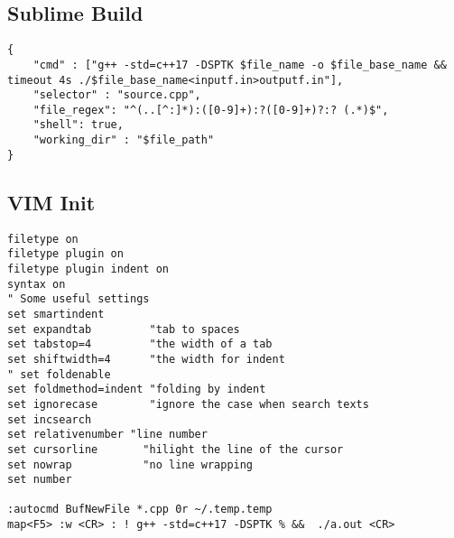 \subsection*{Sublime Build}
\begin{lstlisting}
{
    "cmd" : ["g++ -std=c++17 -DSPTK $file_name -o $file_base_name && timeout 4s ./$file_base_name<inputf.in>outputf.in"], 
    "selector" : "source.cpp",
    "file_regex": "^(..[^:]*):([0-9]+):?([0-9]+)?:? (.*)$",
    "shell": true,
    "working_dir" : "$file_path"
}
\end{lstlisting}

\subsection*{VIM Init}
\begin{lstlisting}
filetype on
filetype plugin on
filetype plugin indent on
syntax on
" Some useful settings
set smartindent
set expandtab         "tab to spaces
set tabstop=4         "the width of a tab
set shiftwidth=4      "the width for indent
" set foldenable
set foldmethod=indent "folding by indent
set ignorecase        "ignore the case when search texts
set incsearch
set relativenumber "line number
set cursorline       "hilight the line of the cursor
set nowrap           "no line wrapping
set number

:autocmd BufNewFile *.cpp 0r ~/.temp.temp
map<F5> :w <CR> : ! g++ -std=c++17 -DSPTK % &&  ./a.out <CR>
\end{lstlisting}